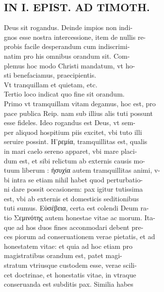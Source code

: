 \documentclass{article}
\begin{document}
\begin{pages}
\section*{IN I. EPIST. AD TIMOTH. \\
                }
Deus sit rogandus. Deinde impios non indi- \\
                gnos esse nostra intercessione, item de nullis re- \\
                probis facile desperandum cum indiscrimi- \\
                natim pro his omnibus orandum sit. Com- \\
                plemus hoc modo Christi mandatum, vt ho- \\
                sti benefaciamus, praecipientis. \\
                Vt tranquillam et quietam, etc. \\
                Tertio loco indicat quo fine sit orandum. \\
                Primo vt tramquillam vitam degamus, hoc est, pro \\
                pace publica Reip. nam sub illius alis tuti possunt \\
                esse fideles. Ideo rogandus est Deus, vt sem- \\
                per aliquod hospitium piis excitet, vbi tuto illi \\
                seruire possint. H'ρεμία, tramquillitas est, qualis \\
                in mari caelo sereno apparet, vbi mare placi- \\
                dum est, et sibi relictum ab externis causis mo- \\
                tuum liberum : ἠσυχία autem tramquillitas animi, v- \\
                bi intra se etiam nihil habet quod perturbatio- \\
                ni dare possit occasionem: pax igitur tutissima \\
                est, vbi ab externis et domesticis seditionibus \\
                tuti sumus. Εὐσέβεια, certa est colendi Deum ra- \\
                tio Σεμινότης autem honestae vitae ac morum. Ita- \\
                que ad hos duos fines acconmodari debent pre- \\
                ces piorum ad conseruationem verae pietatis, et ad \\
                honestatem vitae: et quia ad hoc etiam pro \\
                magistratibus orandum est, patet magi- \\
                stratum vtriusque custodem esse, verae scili- \\
                cet doctrinae, et honestatis vitae, in vtraque \\
                conseruanda est subditis pax. Similia habes \\
                

\end{pages}
\end{document}
